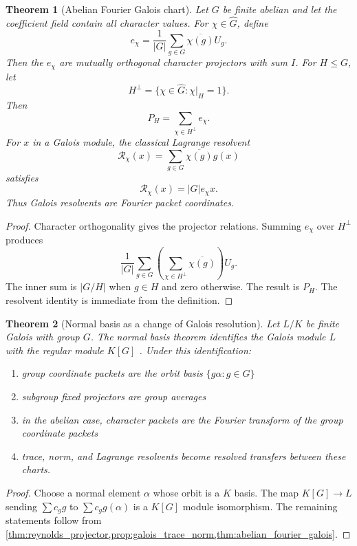 \documentclass{aomart}
\newtheorem{theorem}{Theorem}[section]
\theoremstyle{definition}
\theoremstyle{remark}
\newcommand{\Rcite}[1]{\cite{#1}}
\begin{document}
\begin{theorem}[Abelian Fourier Galois chart]\label{thm:abelian_fourier_galois}
Let \(G\) be finite abelian and let the coefficient field contain all character values. For \(\chi\in\widehat G\), define
\[
 e_\chi
 =
 \frac1{|G|}\sum_{g\in G}\overline{\chi(g)}U_g.
\]
Then the \(e_\chi\) are mutually orthogonal character projectors with sum \(I\). For \(H\leq G\), let
\[
 H^\perp
 =
 \{\chi\in\widehat G:\chi|_H=1\}.
\]
Then
\[
 \boxed{
 P_H
 =
 \sum_{\chi\in H^\perp}e_\chi.
 }
\]
For \(x\) in a Galois module, the classical Lagrange resolvent
\[
 \mathcal R_\chi(x)
 =
 \sum_{g\in G}\overline{\chi(g)}g(x)
\]
satisfies
\[
 \boxed{
 \mathcal R_\chi(x)=|G|e_\chi x.
 }
\]
Thus Galois resolvents are Fourier packet coordinates.
\end{theorem}

\begin{proof}
Character orthogonality gives the projector relations. Summing \(e_\chi\) over \(H^\perp\) produces
\[
 \frac1{|G|}\sum_{g\in G}
 \left(\sum_{\chi\in H^\perp}\overline{\chi(g)}\right)U_g.
\]
The inner sum is \(|G/H|\) when \(g\in H\) and zero otherwise. The result is \(P_H\). The resolvent identity is immediate from the definition.
\end{proof}

\begin{theorem}[Normal basis as a change of Galois resolution]\label{thm:normal_basis_resolution}
Let \(L/K\) be finite Galois with group \(G\). The normal basis theorem identifies the Galois module \(L\) with the regular module \(K[G]\) \Rcite{R28}. Under this identification:
\begin{enumerate}
\item group coordinate packets are the orbit basis \(\{g\alpha:g\in G\}\)
\item subgroup fixed projectors are group averages
\item in the abelian case, character packets are the Fourier transform of the group coordinate packets
\item trace, norm, and Lagrange resolvents become resolved transfers between these charts.
\end{enumerate}
\end{theorem}

\begin{proof}
Choose a normal element \(\alpha\) whose orbit is a \(K\) basis. The map \(K[G]\to L\) sending \(\sum c_gg\) to \(\sum c_gg(\alpha)\) is a \(K[G]\) module isomorphism. The remaining statements follow from \cref{thm:reynolds_projector,prop:galois_trace_norm,thm:abelian_fourier_galois}.
\end{proof}
\end{document}
